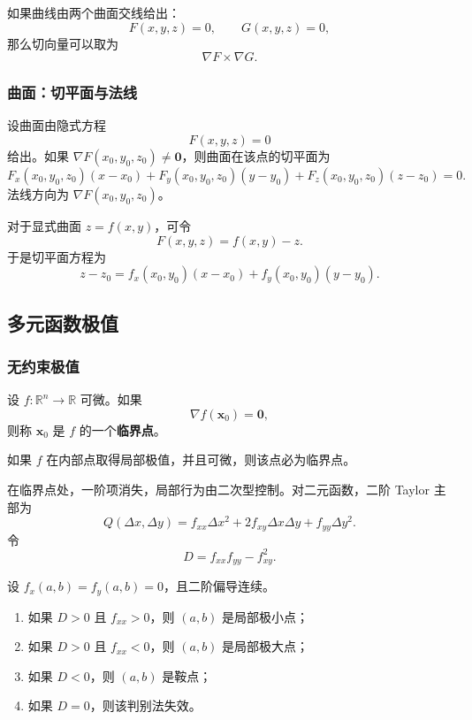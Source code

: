 如果曲线由两个曲面交线给出：
\[
    F(x,y,z)=0,
    \qquad
    G(x,y,z)=0,
\]
那么切向量可以取为
\[
    \nabla F\times\nabla G.
\]

\subsubsection{曲面：切平面与法线}

设曲面由隐式方程
\[
    F(x,y,z)=0
\]
给出。如果 $\nabla F(x_0,y_0,z_0)\neq\mathbf{0}$，则曲面在该点的切平面为
\[
    F_x(x_0,y_0,z_0)(x-x_0)+F_y(x_0,y_0,z_0)(y-y_0)+F_z(x_0,y_0,z_0)(z-z_0)=0.
\]
法线方向为 $\nabla F(x_0,y_0,z_0)$。

对于显式曲面 $z=f(x,y)$，可令
\[
    F(x,y,z)=f(x,y)-z.
\]
于是切平面方程为
\[
    z-z_0=f_x(x_0,y_0)(x-x_0)+f_y(x_0,y_0)(y-y_0).
\]

\subsection{多元函数极值}

\subsubsection{无约束极值}

\begin{definition}[临界点]
设 $f:\mathbb{R}^n\to\mathbb{R}$ 可微。如果
\[
    \nabla f(\mathbf{x}_0)=\mathbf{0},
\]
则称 $\mathbf{x}_0$ 是 $f$ 的一个\textbf{临界点}。
\end{definition}

如果 $f$ 在内部点取得局部极值，并且可微，则该点必为临界点。

在临界点处，一阶项消失，局部行为由二次型控制。对二元函数，二阶 Taylor 主部为
\[
    Q(\Delta x,\Delta y)=
    f_{xx}\Delta x^2+2f_{xy}\Delta x\Delta y+f_{yy}\Delta y^2.
\]
令
\[
    D=f_{xx}f_{yy}-f_{xy}^2.
\]

\begin{theorem}[二元函数二阶判别法]
设 $f_x(a,b)=f_y(a,b)=0$，且二阶偏导连续。
\begin{enumerate}
    \item 如果 $D>0$ 且 $f_{xx}>0$，则 $(a,b)$ 是局部极小点；
    \item 如果 $D>0$ 且 $f_{xx}<0$，则 $(a,b)$ 是局部极大点；
    \item 如果 $D<0$，则 $(a,b)$ 是鞍点；
    \item 如果 $D=0$，则该判别法失效。
\end{enumerate}
\end{theorem}

